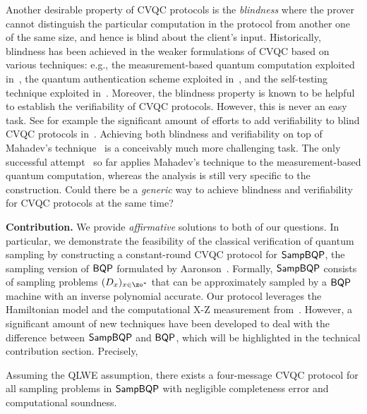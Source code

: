 Another desirable property of CVQC protocols is the \emph{blindness} where the prover cannot distinguish the particular computation in the protocol from another one of the same size, and hence is blind about the client's input. 
Historically, blindness has been achieved in the weaker formulations of CVQC based on various techniques: e.g., the measurement-based quantum computation exploited in~\cite{BFK09}, the quantum authentication scheme exploited in~\cite{arXiv:ABOEM17}, and the self-testing technique exploited in~\cite{Nat:RUV13}. 
Moreover, the blindness property is known to be helpful to establish the verifiability of CVQC protocols. However, this is never an easy task. 
See for example the significant amount of efforts to add verifiability to blind CVQC protocols in~\cite{FK17}. 
Achieving both blindness and verifiability on top of Mahadev's technique~\cite{FOCS:Mahadev18a} is a conceivably much more challenging task. 
The only successful attempt~\cite{FOCS:GheVid19} so far applies Mahadev's technique to the measurement-based quantum computation, 
whereas the analysis is still very specific to the construction. 
Could there be a \emph{generic} way to achieve blindness and verifiability for CVQC protocols at the same time?


\vspace{2mm} \noindent \textbf{Contribution.} We provide \emph{affirmative} solutions to both of our questions. 
In particular, we demonstrate the feasibility of the classical verification of quantum sampling by 
constructing a constant-round CVQC protocol for $\operatorname{\mathsf{SampBQP}}$, the sampling version of $\operatorname{\mathsf{BQP}}$ formulated by Aaronson~\cite{aaronson_2013}. Formally, $\operatorname{\mathsf{SampBQP}}$ consists of sampling problems $(D_x)_{x\in\zo^*}$ that can be approximately sampled by a $\operatorname{\mathsf{BQP}}$ machine with an inverse polynomial accurate. %
Our protocol leverages the Hamiltonian model and the computational X-Z measurement from~\cite{FOCS:Mahadev18a}.
However, a significant amount of new techniques have been developed to deal with the difference between $\operatorname{\mathsf{SampBQP}}$ and $\operatorname{\mathsf{BQP}}$, which will be highlighted in the technical contribution section. Precisely, 
\begin{theorem}[informal]
Assuming the QLWE assumption, there exists a four-message CVQC protocol for all sampling problems in $\operatorname{\mathsf{SampBQP}}$ with negligible completeness error and computational soundness.
\end{theorem}

